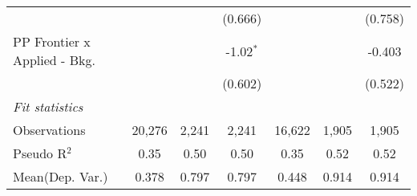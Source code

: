 \begin{tabular}{lcccccc}
                                  &                &               & (0.666)       &                &               & (0.758)\\   
   PP Frontier x Applied - Bkg.   &                &               & -1.02$^{*}$   &                &               & -0.403\\   
                                  &                &               & (0.602)       &                &               & (0.522)\\   
   \midrule
   \emph{Fit statistics}\\
   Observations                   & 20,276         & 2,241         & 2,241         & 16,622         & 1,905         & 1,905\\  
   Pseudo R$^2$                   & 0.35           & 0.50          & 0.50          & 0.35           & 0.52          & 0.52\\  
Mean(Dep. Var.) & 0.378 & 0.797 & 0.797 & 0.448 & 0.914 & 0.914 \\
   

\end{tabular}

